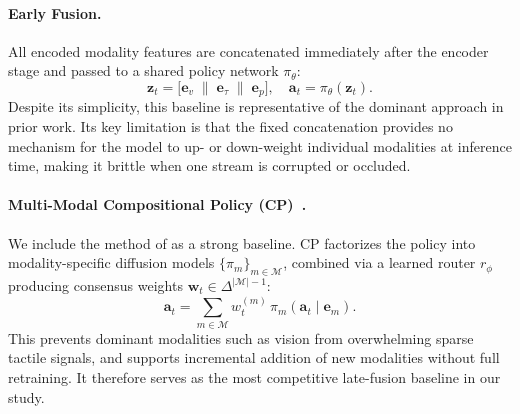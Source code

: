 \documentclass{article}
\begin{document}
\paragraph{Early Fusion.}
All encoded modality features are concatenated immediately after the encoder stage and passed to a shared policy network $\pi_\theta$:
\begin{equation}
    \mathbf{z}_t = \bigl[\mathbf{e}_v \;\|\; \mathbf{e}_\tau \;\|\;
    \mathbf{e}_p\bigr], \quad \mathbf{a}_t = \pi_\theta(\mathbf{z}_t).
\end{equation}
Despite its simplicity, this baseline is representative of the dominant approach in prior work. Its key limitation is that the fixed concatenation provides no mechanism for the model to up- or down-weight individual modalities at inference time, making it brittle when one stream is corrupted or occluded.

\paragraph{Multi-Modal Compositional Policy (CP)~\citep{chen2025consensus}.}
We include the method of \citet{chen2025consensus} as a strong baseline. CP factorizes the policy into modality-specific diffusion models $\{\pi_m\}_{m \in \mathcal{M}}$, combined via a learned router $r_\phi$ producing consensus weights $\mathbf{w}_t \in \Delta^{|\mathcal{M}|-1}$:
\begin{equation}
    \mathbf{a}_t = \sum_{m \in \mathcal{M}} w_t^{(m)}\,
    \pi_m\!\left(\mathbf{a}_t \mid \mathbf{e}_m\right).
\end{equation}
This prevents dominant modalities such as vision from overwhelming sparse tactile signals, and supports incremental addition of new modalities without full retraining. It therefore serves as the most competitive late-fusion baseline in our study.


\end{document}
